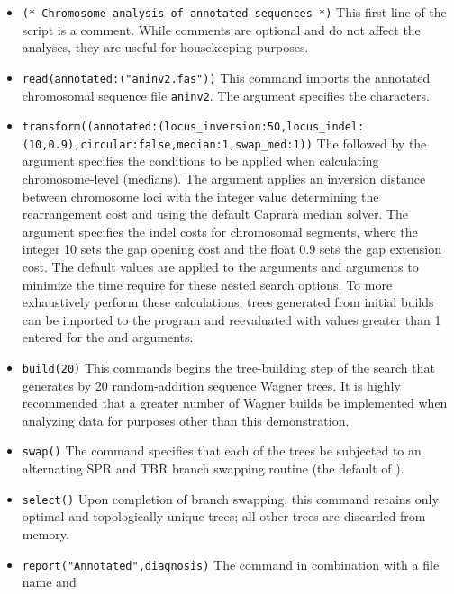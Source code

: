\begin{itemize}
\item \texttt{(* Chromosome analysis of annotated sequences  *)} This first line of the script is a comment. While 
comments are optional and do not affect the analyses, they are useful for housekeeping purposes.
\item \texttt{read(annotated:("aninv2.fas"))} This command imports the annotated chromosomal sequence file 
\texttt{aninv2}. The argument  specifies the characters. 
\item \texttt{transform((annotated:(locus\_inversion:50,locus\_indel:\\(10,0.9),circular:false,median:1,swap\_med:1))}  The 
 follow\-ed by the argument  specifies the conditions to be 
applied when calculating chromosome-level (medians).  The argument  applies 
an inversion distance between chromosome loci with the integer value determining the rearrangement cost and 
using the default Caprara median solver. The argument  specifies the indel costs 
for chromosomal segments, where the integer 10 sets the gap opening cost and the float 0.9 sets the gap extension 
cost.  The default values are applied to the arguments    and 
 arguments to minimize the time require for these nested search options. To more 
exhaustively perform these calculations, trees generated from initial builds can be imported to the program and 
reevaluated with values greater than 1 entered for the  and  
arguments.
\item \texttt{build(20)} This commands begins the tree-building step of the search that generates by 20 random-addition 
sequence Wagner trees.  It is highly recommended that a greater number of Wagner builds be implemented when analyzing 
data for purposes other than this demonstration.
\item \texttt{swap()} The  command specifies that each of the trees be subjected to an alternating 
SPR and TBR branch swapping routine (the default of \poy).
\item \texttt{select()} Upon completion of branch swapping, this command retains only optimal and topologically 
unique trees; all other trees are discarded from memory. 
\item \texttt{report("Annotated",diagnosis)}  The  command in combination with a file name and 

\end{itemize}
